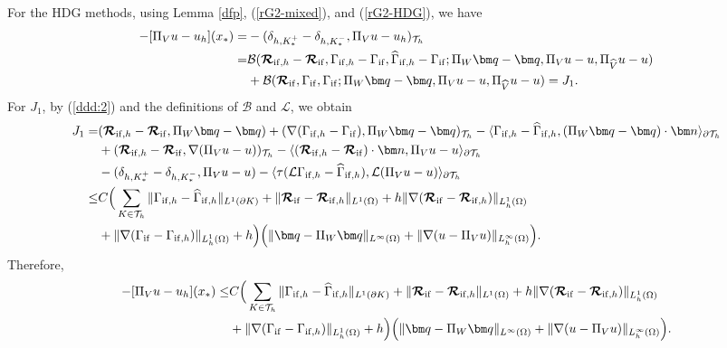 \documentclass[1996/10/24]{amsart}
\theoremstyle{definition}
\numberwithin{equation}{section}
\begin{document}
For the HDG methods, using Lemma \ref{dfp}, (\ref{rG2-mixed}), and (\ref{rG2-HDG}), we have
\begin{align*}
-[\Pi_Vu-u_h](x_{\ast})=&-(\delta_{h,K_{\ast}^+}-\delta_{h,K_{\ast}^-},\Pi_Vu-u_h)_{\mathcal{T}_h}\nonumber\\
=&\mathcal{B}(\boldsymbol{\mathcal{R}}_{{\rm if},h}-\boldsymbol{\mathcal{R}}_{{\rm if}},\Gamma_{{\rm if},h}-\Gamma_{{\rm if}},\widehat{\Gamma}_{{\rm if},h}-\Gamma_{{\rm if}};\Pi_W{\bm q}-{\bm q},\Pi_Vu-u,\Pi_{\widehat{V}}u-u)\nonumber\\
&+\mathcal{B}(\boldsymbol{\mathcal{R}}_{{\rm if}},\Gamma_{{\rm if}},\Gamma_{{\rm if}};\Pi_W{\bm q}-{\bm q},\Pi_Vu-u,\Pi_{\widehat{V}}u-u)=J_1.\nonumber
\end{align*}
For $J_1$, by (\ref{ddd:2}) and the definitions of $\mathcal{B}$ and $\mathcal{L}$, we obtain
\begin{align*}
J_1=&(\boldsymbol{\mathcal{R}}_{{\rm if},h}-\boldsymbol{\mathcal{R}}_{{\rm if}},\Pi_W{\bm q}-{\bm q})+
(\nabla(\Gamma_{{\rm if},h}-\Gamma_{{\rm if}}),\Pi_W{\bm q}-{\bm q})_{\mathcal{T}_h}-\langle\Gamma_{{\rm if},h}-\widehat{\Gamma}_{{\rm if},h},(\Pi_W{\bm q}-{\bm q})\cdot{\bm n}\rangle_{\partial\mathcal{T}_h}\\
&+(\boldsymbol{\mathcal{R}}_{{\rm if},h}-\boldsymbol{\mathcal{R}}_{{\rm if}},\nabla(\Pi_Vu-u))_{\mathcal{T}_h}-\langle
(\boldsymbol{\mathcal{R}}_{{\rm if},h}-\boldsymbol{\mathcal{R}}_{{\rm if}})\cdot{\bm n},\Pi_Vu-u\rangle_{\partial\mathcal{T}_h}\\
&-(\delta_{h,K_{\ast}^+}-\delta_{h,K_{\ast}^-},\Pi_Vu-u)-\langle\tau(\mathcal{L}\Gamma_{{\rm if},h}-\widehat{\Gamma}_{{\rm if},h}),
\mathcal{L}(\Pi_Vu-u)\rangle_{\partial\mathcal{T}_h}\\
\leq&C\Big(\sum_{K\in\mathcal{T}_h}\|\Gamma_{{\rm if},h}-\widehat{\Gamma}_{{\rm if},h}\|_{L^1(\partial K)}+\|\boldsymbol{\mathcal{R}}_{{\rm if}}-\boldsymbol{\mathcal{R}}_{{\rm if},h}\|_{L^1(\Omega)}+h\|\nabla(\boldsymbol{\mathcal{R}}_{{\rm if}}-\boldsymbol{\mathcal{R}}_{{\rm if},h})\|_{L_h^1(\Omega)}\\
&+\|\nabla(\Gamma_{{\rm if}}-\Gamma_{{\rm if},h})\|_{L_h^1(\Omega)}+h\Big)\Big(\|{\bm q}-\Pi_W{\bm q}\|_{L^{\infty}(\Omega)}+\|\nabla(u-\Pi_Vu)\|_{L^{\infty}_h(\Omega)}\Big).
\end{align*}
Therefore,
\begin{align}
-[\Pi_Vu-u_h](x_{\ast})\leq& C\Big(\sum_{K\in\mathcal{T}_h}\|\Gamma_{{\rm if},h}-\widehat{\Gamma}_{{\rm if},h}\|_{L^1(\partial K)}+\|\boldsymbol{\mathcal{R}}_{{\rm if}}-\boldsymbol{\mathcal{R}}_{{\rm if},h}\|_{L^1(\Omega)}+h\|\nabla(\boldsymbol{\mathcal{R}}_{{\rm if}}-\boldsymbol{\mathcal{R}}_{{\rm if},h})\|_{L_h^1(\Omega)}\nonumber\\
&+\|\nabla(\Gamma_{{\rm if}}-\Gamma_{{\rm if},h})\|_{L_h^1(\Omega)}+h\Big)\Big(\|{\bm q}-\Pi_W{\bm q}\|_{L^{\infty}(\Omega)}+\|\nabla(u-\Pi_Vu)\|_{L^{\infty}_h(\Omega)}\Big).\label{rG2:2}
\end{align}
\end{document}
